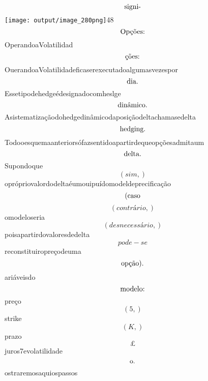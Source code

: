 \documentclass{article}
\begin{document}
\begin{equation}
$signi-$
\end{equation}\texttt{[image: output/image\_280png]}48\begin{equation}
$Opções:$
\end{equation}OperandoaVolatilidad\begin{equation}
$ções:$
\end{equation}OuerandoaVolatilidadeficaserexecutadoalgumasvezespor\begin{equation}
$dia.$
\end{equation}Essetipodehedgeédesignadocomheslge\begin{equation}
$dinâmico.$
\end{equation}Asistematizaçãodohedgedinâmicodaposiçãodeltachamasedelta\begin{equation}
$hedging.$
\end{equation}Todooesquemaanteriorsófazsentidoapartirdequeopçõesadmitaum\begin{equation}
$delta.$
\end{equation}Supondoque\begin{equation}
\left( sim,\right)
\end{equation}oprópriovalordodeltaéumouipuídomodeldeprecificação\begin{equation}
$(caso$
\end{equation}\begin{equation}
\left( contrário,\right)
\end{equation}omodeloseria\begin{equation}
\left( desnecessário,\right)
\end{equation}poisapartirdovaloresdedelta\begin{equation}
pode - se
\end{equation}reconstituiropreçodeuma\begin{equation}
$opção).$
\end{equation}ariáveisdo\begin{equation}
$modelo:$
\end{equation}preço\begin{equation}
\left( 5,\right)
\end{equation}strike\begin{equation}
\left( K,\right)
\end{equation}prazo\begin{equation}
£
\end{equation}juros7evolatilidade\begin{equation}
$o.$
\end{equation}ostraremosaquiospassos\begin{equation}

\end{equation}
\end{document}
